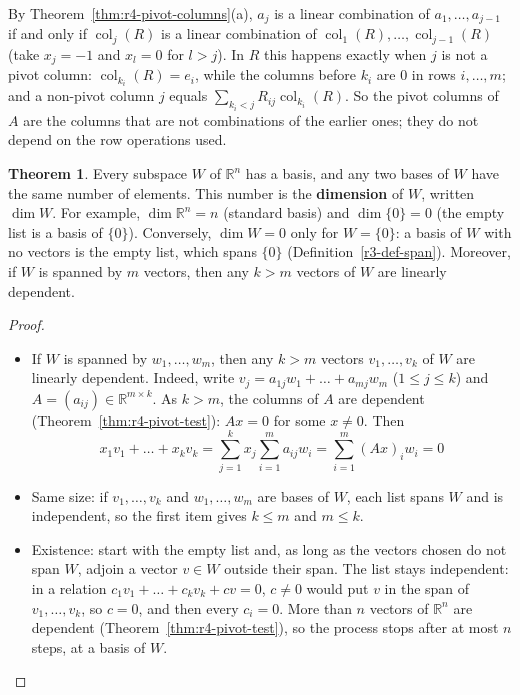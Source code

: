 \documentclass[12pt]{article}
\newcommand{\R}{\mathbb R}
\DeclareMathOperator{\col}{col}
\theoremstyle{definition}
\newtheorem{theorem}{Theorem}
\begin{document}
By Theorem~\ref{thm:r4-pivot-columns}(a), \(a_j\) is a linear combination of \(a_1,\dots,a_{j-1}\) if
and only if \(\col_j(R)\) is a linear combination of \(\col_1(R),\dots,\col_{j-1}(R)\) (take
\(x_j=-1\) and \(x_l=0\) for \(l>j\)). In \(R\) this happens exactly when \(j\) is not a pivot column:
\(\col_{k_i}(R)=e_i\), while the columns before \(k_i\) are \(0\) in rows \(i,\dots,m\); and a
non-pivot column \(j\) equals \(\sum_{k_i<j}R_{ij}\col_{k_i}(R)\). So the pivot columns of \(A\) are
the columns that are not combinations of the earlier ones; they do not depend on the row operations
used.

\begin{theorem}\label{thm:r4-dimension}
Every subspace \(W\) of \(\R^n\) has a basis, and any two bases of \(W\) have the same number of
elements. This number is the \textbf{dimension} of \(W\), written \(\dim W\). For example,
\(\dim\R^n=n\) (standard basis) and \(\dim\{0\}=0\) (the empty list is a basis of \(\{0\}\)). Conversely,
\(\dim W=0\) only for \(W=\{0\}\): a basis of \(W\) with no vectors is the empty list, which spans \(\{0\}\)
(Definition~\ref{r3-def-span}). Moreover, if \(W\) is spanned by \(m\) vectors, then any \(k>m\) vectors of \(W\)
are linearly dependent.
\end{theorem}
\begin{proof}
\begin{itemize}
\item If \(W\) is spanned by \(w_1,\dots,w_m\), then any \(k>m\) vectors \(v_1,\dots,v_k\) of \(W\)
are linearly dependent. Indeed, write \(v_j=a_{1j}w_1+\dots+a_{mj}w_m\) (\(1\leqslant j\leqslant k\))
and \(A=(a_{ij})\in\R^{m\times k}\). As \(k>m\), the columns of \(A\) are dependent
(Theorem~\ref{thm:r4-pivot-test}): \(Ax=0\) for some \(x\ne0\). Then
\[
x_1v_1+\dots+x_kv_k=\sum_{j=1}^kx_j\sum_{i=1}^ma_{ij}w_i=\sum_{i=1}^m(Ax)_iw_i=0
\]
\item Same size: if \(v_1,\dots,v_k\) and \(w_1,\dots,w_m\) are bases of \(W\), each list spans
\(W\) and is independent, so the first item gives \(k\leqslant m\) and \(m\leqslant k\).
\item Existence: start with the empty list and, as long as the vectors chosen do not span \(W\),
adjoin a vector \(v\in W\) outside their span. The list stays independent: in a relation
\(c_1v_1+\dots+c_kv_k+cv=0\), \(c\ne0\) would put \(v\) in the span of \(v_1,\dots,v_k\), so \(c=0\),
and then every \(c_i=0\). More than \(n\) vectors of \(\R^n\) are dependent
(Theorem~\ref{thm:r4-pivot-test}), so the process stops after at most \(n\) steps, at a basis of
\(W\).\qedhere
\end{itemize}
\end{proof}
\end{document}

